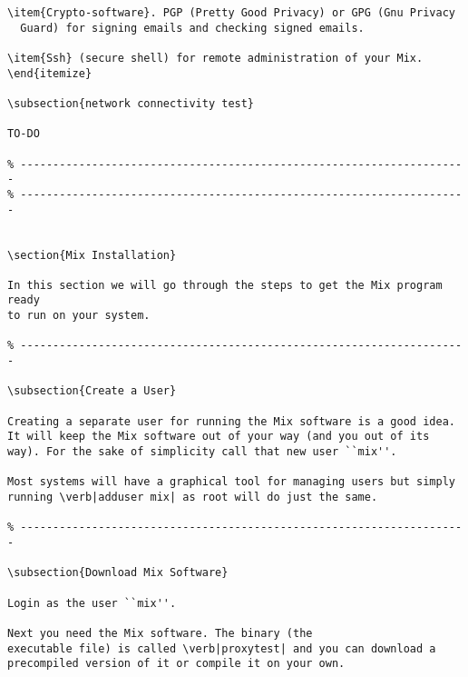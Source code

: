 \documentclass{article}
\begin{document}
\begin{verbatim}
\item{Crypto-software}. PGP (Pretty Good Privacy) or GPG (Gnu Privacy
  Guard) for signing emails and checking signed emails.

\item{Ssh} (secure shell) for remote administration of your Mix.
\end{itemize}

\subsection{network connectivity test}

TO-DO

% ---------------------------------------------------------------------
% ---------------------------------------------------------------------


\section{Mix Installation}

In this section we will go through the steps to get the Mix program ready
to run on your system. 

% ---------------------------------------------------------------------

\subsection{Create a User}

Creating a separate user for running the Mix software is a good idea.
It will keep the Mix software out of your way (and you out of its
way). For the sake of simplicity call that new user ``mix''.

Most systems will have a graphical tool for managing users but simply
running \verb|adduser mix| as root will do just the same.

% ---------------------------------------------------------------------

\subsection{Download Mix Software}

Login as the user ``mix''.

Next you need the Mix software. The binary (the
executable file) is called \verb|proxytest| and you can download a
precompiled version of it or compile it on your own.


\end{verbatim}
\end{document}
